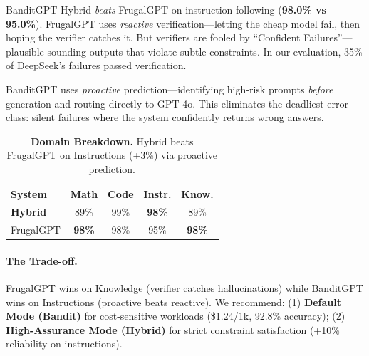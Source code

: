 BanditGPT Hybrid \emph{beats} FrugalGPT on instruction-following (\textbf{98.0\% vs 95.0\%}). FrugalGPT uses \emph{reactive} verification---letting the cheap model fail, then hoping the verifier catches it. But verifiers are fooled by ``Confident Failures''---plausible-sounding outputs that violate subtle constraints. In our evaluation, 35\% of DeepSeek's failures passed verification.

BanditGPT uses \emph{proactive} prediction---identifying high-risk prompts \emph{before} generation and routing directly to GPT-4o. This eliminates the deadliest error class: silent failures where the system confidently returns wrong answers.

\begin{table}[t]
\centering
\small
\caption{\textbf{Domain Breakdown.} Hybrid beats FrugalGPT on Instructions (+3\%) via proactive prediction.}
\label{tab:domain_breakdown}
\begin{tabular}{lcccc}
\toprule
\textbf{System} & \textbf{Math} & \textbf{Code} & \textbf{Instr.} & \textbf{Know.} \\
\midrule
\textbf{Hybrid} & 89\% & 99\% & \textbf{98\%} & 89\% \\
FrugalGPT & \textbf{98\%} & 98\% & 95\% & \textbf{98\%} \\
\bottomrule
\end{tabular}
\end{table}

\paragraph{The Trade-off.} FrugalGPT wins on Knowledge (verifier catches hallucinations) while BanditGPT wins on Instructions (proactive beats reactive). We recommend: (1) \textbf{Default Mode (Bandit)} for cost-sensitive workloads (\$1.24/1k, 92.8\% accuracy); (2) \textbf{High-Assurance Mode (Hybrid)} for strict constraint satisfaction (+10\% reliability on instructions).
